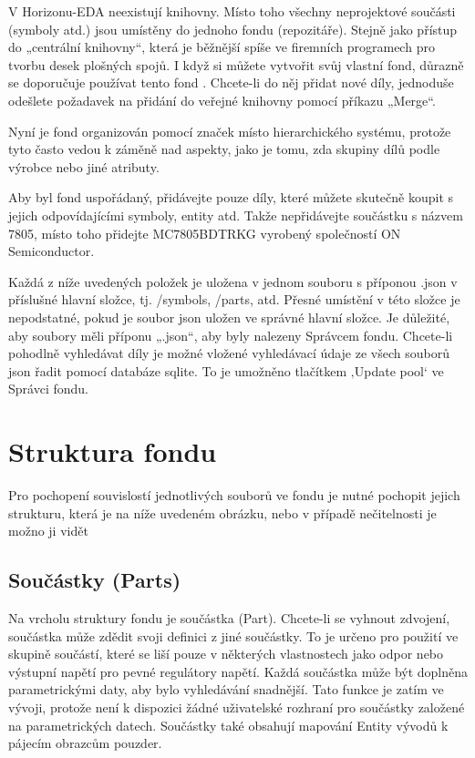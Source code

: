 \documentclass[letterpaper,10pt,czech]{sphinxmanual}
\begin{document}
V Horizonu-EDA neexistují knihovny. Místo toho všechny neprojektové součásti (symboly atd.) jsou umístěny do jednoho fondu (repozitáře). Stejně jako přístup do „centrální knihovny“, která je běžnější spíše ve firemních programech pro tvorbu desek plošných spojů. I když si můžete vytvořit svůj vlastní fond, důrazně se doporučuje používat tento fond
. Chcete-li do něj přidat nové díly, jednoduše odešlete požadavek na přidání do veřejné knihovny pomocí příkazu „Merge“.

Nyní je fond organizován pomocí značek místo hierarchického
systému, protože tyto často vedou k záměně nad aspekty, jako je tomu, zda
skupiny dílů podle výrobce nebo jiné atributy.

Aby byl fond uspořádaný, přidávejte pouze díly, které můžete skutečně koupit s jejich odpovídajícími symboly, entity atd. Takže nepřidávejte součástku s názvem 7805, místo toho přidejte MC7805BDTRKG vyrobený společností ON Semiconductor.

Každá z níže uvedených položek je uložena v jednom souboru s příponou .json v příslušné hlavní složce, tj. /symbols, /parts, atd. Přesné umístění v této složce je nepodstatné, pokud je soubor json uložen ve
správné hlavní složce. Je důležité, aby soubory měli příponu „.json“, aby byly nalezeny Správcem fondu. Chcete-li pohodlně vyhledávat díly je možné vložené vyhledávací údaje ze všech souborů json řadit pomocí databáze sqlite. To je umožněno tlačítkem ‚Update pool‘ ve Správci fondu.


\section{Struktura fondu}
\label{\detokenize{pool-elements:struktura-fondu}}
Pro pochopení souvislostí jednotlivých souborů ve fondu je nutné pochopit jejich strukturu, která je na níže uvedeném obrázku, nebo v případě nečitelnosti je možno ji vidět


\subsection{Součástky (Parts)}
\label{\detokenize{pool-elements:soucastky-parts}}
Na vrcholu struktury fondu je součástka (Part). Chcete-li se vyhnout zdvojení,
součástka může zdědit svoji definici z jiné součástky. To je určeno pro použití ve skupině součástí, které se liší pouze v některých vlastnostech jako odpor nebo výstupní napětí pro pevné regulátory napětí. Každá součástka může být doplněna parametrickými daty, aby bylo vyhledávání snadnější. Tato funkce je zatím ve vývoji, protože není k dispozici žádné uživatelské rozhraní pro součástky založené na parametrických datech. Součástky také obsahují mapování Entity vývodů k pájecím obrazcům pouzder.
\end{document}
